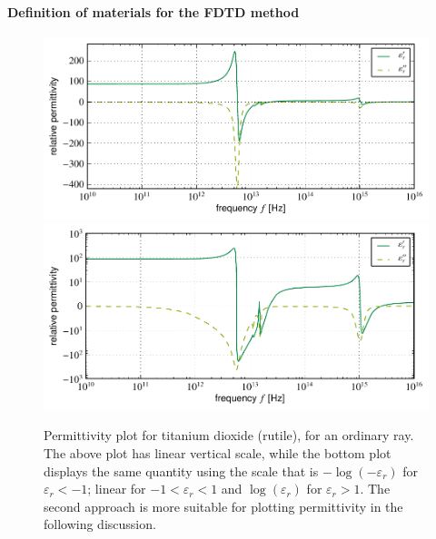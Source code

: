 \paragraph{Definition of materials for the FDTD method} %
\label{def_of_mat}

\begin{figure}[t] \caption{Permittivity plot for titanium dioxide (rutile), for an ordinary ray. The above plot has linear vertical scale, while the bottom plot displays the same quantity using the scale that is $-\log(-\varepsilon_r)$ for $\varepsilon_r<-1$; linear for $-1<\varepsilon_r<1$ and $\log(\varepsilon_r)$ for $\varepsilon_r > 1$. The second approach is more suitable for plotting permittivity in the following discussion.} \label{fg_tio2eps} \centering 
	\includegraphics[width=14cm]{img/epsilon_TiO2_linear.pdf}
	\includegraphics[width=14cm]{img/epsilon_TiO2_symlog.pdf}
\end{figure}


